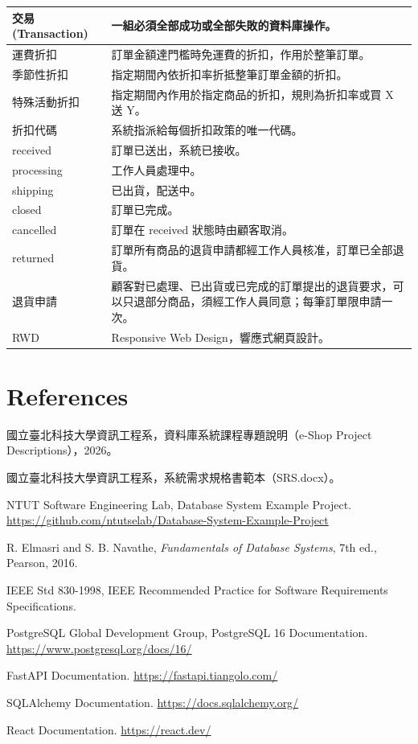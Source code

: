 \documentclass[12pt,a4paper]{article}
\begin{document}
\begin{xltabular}{\linewidth}{|>{\centering\arraybackslash}p{3.4cm}|X|}
交易 (Transaction) & 一組必須全部成功或全部失敗的資料庫操作。\\\hline
運費折扣 & 訂單金額達門檻時免運費的折扣，作用於整筆訂單。\\\hline
季節性折扣 & 指定期間內依折扣率折抵整筆訂單金額的折扣。\\\hline
特殊活動折扣 & 指定期間內作用於指定商品的折扣，規則為折扣率或買 X 送 Y。\\\hline
折扣代碼 & 系統指派給每個折扣政策的唯一代碼。\\\hline
received & 訂單已送出，系統已接收。\\\hline
processing & 工作人員處理中。\\\hline
shipping & 已出貨，配送中。\\\hline
closed & 訂單已完成。\\\hline
cancelled & 訂單在 received 狀態時由顧客取消。\\\hline
returned & 訂單所有商品的退貨申請都經工作人員核准，訂單已全部退貨。\\\hline
退貨申請 & 顧客對已處理、已出貨或已完成的訂單提出的退貨要求，可以只退部分商品，須經工作人員同意；每筆訂單限申請一次。\\\hline
RWD & Responsive Web Design，響應式網頁設計。\\\hline
\end{xltabular}

\clearpage
\section*{References}

\begin{enumerate}[label={[\arabic*]},leftmargin=2.5em,itemsep=0.4em]
  \item 國立臺北科技大學資訊工程系，資料庫系統課程專題說明（e-Shop Project Descriptions），2026。
  \item 國立臺北科技大學資訊工程系，系統需求規格書範本（SRS.docx）。
  \item NTUT Software Engineering Lab, Database System Example Project. \url{https://github.com/ntutselab/Database-System-Example-Project}
  \item R. Elmasri and S. B. Navathe, \textit{Fundamentals of Database Systems}, 7th ed., Pearson, 2016.
  \item IEEE Std 830-1998, IEEE Recommended Practice for Software Requirements Specifications.
  \item PostgreSQL Global Development Group, PostgreSQL 16 Documentation. \url{https://www.postgresql.org/docs/16/}
  \item FastAPI Documentation. \url{https://fastapi.tiangolo.com/}
  \item SQLAlchemy Documentation. \url{https://docs.sqlalchemy.org/}
  \item React Documentation. \url{https://react.dev/}
\end{enumerate}
\end{document}
